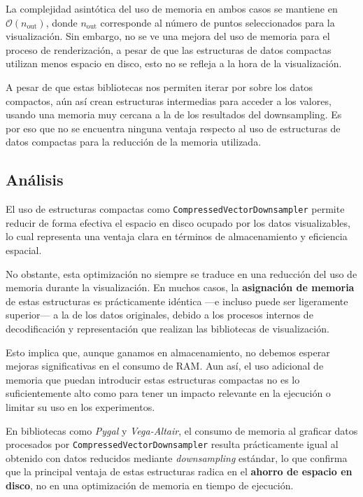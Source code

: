La complejidad asintótica del uso de memoria en ambos casos se mantiene en \(\mathcal{O}(n_{\text{out}})\), donde \(n_{\text{out}}\) corresponde al número de puntos seleccionados para la visualización. Sin embargo, no se ve una mejora del uso de memoria para el proceso de renderización, a pesar de que las estructuras de datos compactas utilizan menos espacio en disco, esto no se refleja a la hora de la visualización.

A pesar de que estas bibliotecas nos permiten iterar por sobre los datos compactos, aún así crean estructuras intermedias para acceder a los valores, usando una memoria muy cercana a la de los resultados del downsampling. Es por eso que no se encuentra ninguna ventaja respecto al uso de estructuras de datos compactas para la reducción de la memoria utilizada.

\subsection{Análisis}

El uso de estructuras compactas como \texttt{CompressedVectorDownsampler} permite reducir de forma efectiva el espacio en disco ocupado por los datos visualizables, lo cual representa una ventaja clara en términos de almacenamiento y eficiencia espacial.  

No obstante, esta optimización no siempre se traduce en una reducción del uso de memoria durante la visualización. En muchos casos, la \textbf{asignación de memoria} de estas estructuras es prácticamente idéntica —e incluso puede ser ligeramente superior— a la de los datos originales, debido a los procesos internos de decodificación y representación que realizan las bibliotecas de visualización.  

Esto implica que, aunque ganamos en almacenamiento, no debemos esperar mejoras significativas en el consumo de RAM. Aun así, el uso adicional de memoria que puedan introducir estas estructuras compactas no es lo suficientemente alto como para tener un impacto relevante en la ejecución o limitar su uso en los experimentos.  

En bibliotecas como \textit{Pygal} y \textit{Vega-Altair}, el consumo de memoria al graficar datos procesados por \texttt{CompressedVectorDownsampler} resulta prácticamente igual al obtenido con datos reducidos mediante \textit{downsampling} estándar, lo que confirma que la principal ventaja de estas estructuras radica en el \textbf{ahorro de espacio en disco}, no en una optimización de memoria en tiempo de ejecución.



